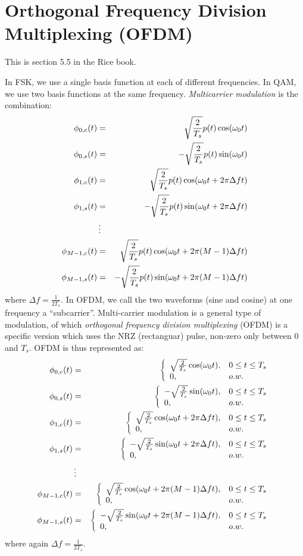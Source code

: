 




\section{Orthogonal Frequency Division Multiplexing (OFDM)}

This is section 5.5 in the Rice book.

In FSK, we use a single basis function at each of different
frequencies.  In QAM, we use two basis functions at the same
frequency.  \emph{Multicarrier modulation} is the combination:
\begin{eqnarray}
 \phi_{0,c}(t) &=& \sqrt{\frac{2}{T_{s}}} p(t) \cos(\omega_0 t)
 \nonumber \\ 
 \phi_{0,s}(t) &=& -\sqrt{\frac{2}{T_{s}}} p(t) \sin(\omega_0 t)
 \nonumber \\ 
 \phi_{1,c}(t) &=& \sqrt{\frac{2}{T_{s}}} p(t) \cos(\omega_0 t + 2\pi \Delta f t)
 \nonumber \\ 
 \phi_{1,s}(t) &=& -\sqrt{\frac{2}{T_{s}}} p(t) \sin(\omega_0 t + 2\pi \Delta f t)
 \nonumber \\ 
  &\vdots & \nonumber \\
 \phi_{M-1,c}(t) &=& \sqrt{\frac{2}{T_{s}}} p(t) \cos(\omega_0 t + 2\pi (M-1)\Delta f t)
 \nonumber \\ 
 \phi_{M-1,s}(t) &=& -\sqrt{\frac{2}{T_{s}}} p(t) \sin(\omega_0 t + 2\pi (M-1)\Delta f t)
 \nonumber
\end{eqnarray}
where $\Delta f = \frac{1}{2T_{s}}$.  In OFDM, we call the two waveforms (sine and cosine) at one frequency a ``subcarrier''.  Multi-carrier modulation is a general type of modulation, of which \emph{orthogonal frequency division multiplexing} (OFDM) is a specific version which uses the NRZ (rectanguar) pulse, non-zero only between 0 and $T_s$.  OFDM is thus represented as:
\begin{eqnarray}
 \phi_{0,c}(t) &=& { \left\{\begin{array}{ll} {\sqrt{\frac{2}{T_{s}}} \cos(\omega_0 t)}, & {0 \le t \le T_{s}} \\ 0, & o.w. \end{array}\right. }
 \nonumber \\ 
 \phi_{0,s}(t) &=& { \left\{\begin{array}{ll} {-\sqrt{\frac{2}{T_{s}}} \sin(\omega_0 t)}, & {0 \le t \le T_{s}} \\ 0, & o.w. \end{array}\right. }
 \nonumber \\ 
 \phi_{1,c}(t) &=& { \left\{\begin{array}{ll} {\sqrt{\frac{2}{T_{s}}} \cos(\omega_0 t + 2\pi \Delta f t)}, & {0 \le t \le T_{s}} \\ 0, & o.w. \end{array}\right. }
 \nonumber \\ 
 \phi_{1,s}(t) &=& { \left\{\begin{array}{ll} {-\sqrt{\frac{2}{T_{s}}} \sin(\omega_0 t + 2\pi \Delta f t)}, & {0 \le t \le T_{s}} \\ 0, & o.w. \end{array}\right. }
 \nonumber \\ 
  &\vdots & \nonumber \\
 \phi_{M-1,c}(t) &=& { \left\{\begin{array}{ll} {\sqrt{\frac{2}{T_{s}}} \cos(\omega_0 t + 2\pi (M-1)\Delta f t)}, & {0 \le t \le T_{s}} \\ 0, & o.w. \end{array}\right. }
 \nonumber \\ 
 \phi_{M-1,s}(t) &=& { \left\{\begin{array}{ll} {-\sqrt{\frac{2}{T_{s}}} \sin(\omega_0 t + 2\pi (M-1)\Delta f t)}, & {0 \le t \le T_{s}} \\ 0, & o.w. \end{array}\right. }
 \nonumber
\end{eqnarray}
where again $\Delta f = \frac{1}{2T_{s}}$. 

